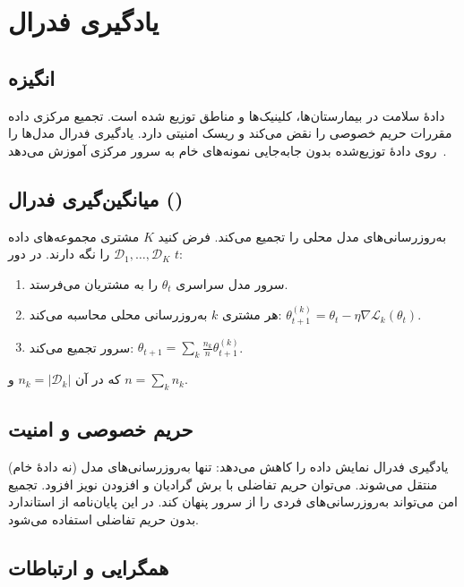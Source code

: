 \section{یادگیری فدرال}

\subsection{انگیزه}

دادۀ سلامت در بیمارستان‌ها، کلینیک‌ها و مناطق توزیع شده است. تجمیع مرکزی داده مقررات حریم خصوصی را نقض می‌کند و ریسک امنیتی دارد. یادگیری فدرال مدل‌ها را روی دادۀ توزیع‌شده بدون جابه‌جایی نمونه‌های خام به سرور مرکزی آموزش می‌دهد~\cite{mcmahan2017communication}.

\subsection{میانگین‌گیری فدرال ()}

 به‌روزرسانی‌های مدل محلی را تجمیع می‌کند. فرض کنید $K$ مشتری مجموعه‌های داده $\mathcal{D}_1, \ldots, \mathcal{D}_K$ را نگه دارند. در دور $t$:
\begin{enumerate}
\item سرور مدل سراسری $\theta_t$ را به مشتریان می‌فرستد.
\item هر مشتری $k$ به‌روزرسانی محلی محاسبه می‌کند: $\theta_{t+1}^{(k)} = \theta_t - \eta \nabla \mathcal{L}_k(\theta_t)$.
\item سرور تجمیع می‌کند: $\theta_{t+1} = \sum_k \frac{n_k}{n} \theta_{t+1}^{(k)}$.
\end{enumerate}
که در آن $n_k = |\mathcal{D}_k|$ و $n = \sum_k n_k$.

\subsection{حریم خصوصی و امنیت}

یادگیری فدرال نمایش داده را کاهش می‌دهد: تنها به‌روزرسانی‌های مدل (نه دادۀ خام) منتقل می‌شوند. می‌توان حریم تفاضلی با برش گرادیان و افزودن نویز افزود. تجمیع امن می‌تواند به‌روزرسانی‌های فردی را از سرور پنهان کند. در این پایان‌نامه از  استاندارد بدون حریم تفاضلی استفاده می‌شود.

\subsection{همگرایی و ارتباطات}

